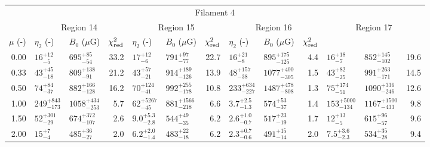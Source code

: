 \begin{tabular}{@{}r llr llr llr llr@{}}
\midrule
\multicolumn{13}{c}{Filament 4} \\
\cmidrule{1-13}
{} & \multicolumn{3}{c}{Region 14}
   & \multicolumn{3}{c}{Region 15}
   & \multicolumn{3}{c}{Region 16}
   & \multicolumn{3}{c}{Region 17} \\
\cmidrule(lr){2-4} \cmidrule(lr){5-7} \cmidrule(lr){8-10} \cmidrule(l){11-13}
$\mu$ (-) & $\eta_2$ (-) & $B_0$ ($\mu$G) & $\chi^2_{\mathrm{red}}$
          & $\eta_2$ (-) & $B_0$ ($\mu$G) & $\chi^2_{\mathrm{red}}$
          & $\eta_2$ (-) & $B_0$ ($\mu$G) & $\chi^2_{\mathrm{red}}$ \\
\cmidrule{1-13}
0.00 & ${16}^{+12}_{-5}$ & ${695}^{+85}_{-54}$ & 33.2
     & ${17}^{+12}_{-6}$ & ${791}^{+97}_{-77}$ & 22.7
     & ${16}^{+21}_{-8}$ & ${895}^{+175}_{-125}$ & 4.4
     & ${16}^{+18}_{-7}$ & ${852}^{+145}_{-102}$ & 19.6 \\
0.33 & ${43}^{+45}_{-18}$ & ${809}^{+138}_{-91}$ & 21.2
     & ${43}^{+57}_{-21}$ & ${914}^{+189}_{-126}$ & 13.9
     & ${48}^{+157}_{-38}$ & ${1077}^{+400}_{-305}$ & 1.5
     & ${43}^{+82}_{-25}$ & ${991}^{+263}_{-171}$ & 14.5 \\
0.50 & ${74}^{+84}_{-37}$ & ${882}^{+166}_{-128}$ & 16.2
     & ${70}^{+124}_{-41}$ & ${992}^{+255}_{-178}$ & 10.8
     & ${233}^{+634}_{-227}$ & ${1487}^{+478}_{-808}$ & 1.3
     & ${75}^{+174}_{-51}$ & ${1090}^{+336}_{-246}$ & 12.6 \\
1.00 & ${249}^{+843}_{-173}$ & ${1058}^{+434}_{-253}$ & 5.7
     & ${62}^{+5267}_{-45}$ & ${881}^{+1566}_{-218}$ & 6.6
     & ${3.7}^{+2.5}_{-1.3}$ & ${574}^{+53}_{-37}$ & 1.4
     & ${153}^{+5000}_{-134}$ & ${1167}^{+1500}_{-433}$ & 9.8 \\
1.50 & ${52}^{+301}_{-29}$ & ${674}^{+372}_{-107}$ & 2.6
     & ${9.0}^{+5.3}_{-2.8}$ & ${544}^{+49}_{-35}$ & 6.2
     & ${2.6}^{+1.0}_{-0.7}$ & ${517}^{+23}_{-19}$ & 1.7
     & ${12}^{+13}_{-5}$ & ${615}^{+96}_{-57}$ & 9.6 \\
2.00 & ${15}^{+7}_{-4}$ & ${485}^{+36}_{-27}$ & 2.0
     & ${6.2}^{+2.0}_{-1.4}$ & ${483}^{+22}_{-18}$ & 6.2
     & ${2.3}^{+0.7}_{-0.6}$ & ${491}^{+15}_{-14}$ & 2.0
     & ${7.5}^{+3.6}_{-2.3}$ & ${534}^{+35}_{-28}$ & 9.4 \\


\end{tabular}
